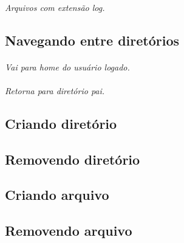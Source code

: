 \documentclass[a4paper,9pt]{extarticle}
\begin{document}
\begin{multicols}{2}
	\paragraph{} \emph{Arquivos com extensão log.}
	
	
\subsection{Navegando entre diretórios}

	\paragraph{}
	\paragraph{} \emph{Vai para home do usuário logado.}
	\paragraph{} \emph{Retorna para diretório pai.}
	
	
\subsection{Criando diretório}


\subsection{Removendo diretório}

	
\subsection{Criando arquivo}
	
	
\subsection{Removendo arquivo}
	
	\paragraph{}
	

\end{multicols}
\end{document}
